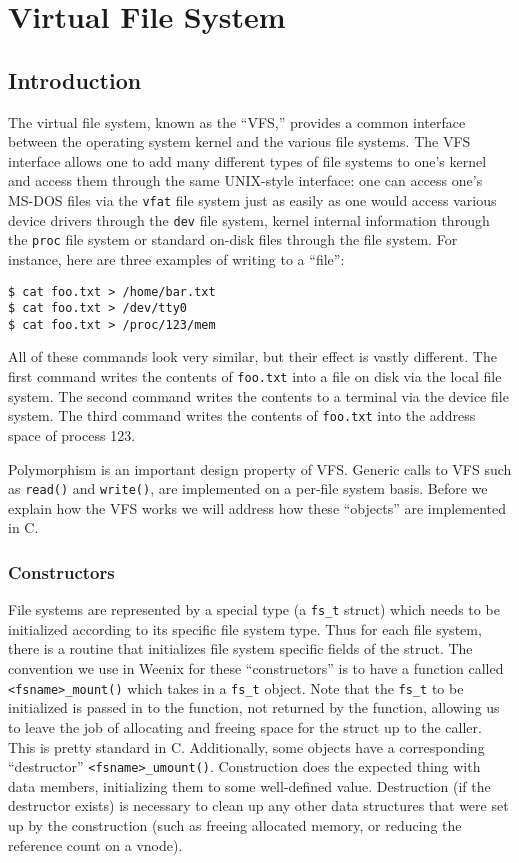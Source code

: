 \chapter{Virtual File System}
\label{vfs}


\section{Introduction}

The virtual file system, known as the ``VFS,'' provides a common interface between the operating system kernel and the various file systems. The VFS interface allows one to add many different types of file systems to one's kernel and access them through the same UNIX-style interface: one can access one's MS-DOS files via the \texttt{vfat} file system just as easily as one would access various device drivers through the \texttt{dev} file system, kernel internal information through the \texttt{proc} file system or standard on-disk files through the  file system. For instance, here are three examples of writing to a ``file'':
\begin{verbatim}
$ cat foo.txt > /home/bar.txt
$ cat foo.txt > /dev/tty0
$ cat foo.txt > /proc/123/mem\end{verbatim}
All of these commands look very similar, but their effect is vastly different. The first command writes the contents of \texttt{foo.txt} into a file on disk via the local file system. The second command writes the contents to a terminal via the device file system. The third command writes the contents of \texttt{foo.txt} into the address space of process 123.

Polymorphism is an important design property of VFS.  Generic calls to VFS such as \texttt{read()} and \texttt{write()}, are implemented on a per-file system basis.  Before we explain how the VFS works we will address how these ``objects'' are implemented in C.

\subsection{Constructors}

File systems are represented by a special type (a \texttt{fs\_t} struct) which needs to be initialized according to its specific file system type. Thus for each file system, there is a routine that initializes file system specific fields of the struct. The convention we use in Weenix for these ``constructors'' is to have a function called \texttt{<fsname>\_mount()} which takes in a \texttt{fs\_t} object. Note that the \texttt{fs\_t} to be initialized is passed in to the function, not returned by the function, allowing us to leave the job of allocating and freeing space for the struct up to the caller. This is pretty standard in C. Additionally, some objects have a corresponding ``destructor'' \texttt{<fsname>\_umount()}. Construction does the expected thing with data members, initializing them to some well-defined value. Destruction (if the destructor exists) is necessary to clean up any other data structures that were set up by the construction (such as freeing allocated memory, or reducing the reference count on a vnode).

